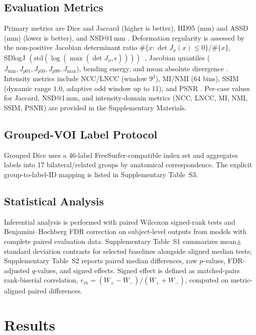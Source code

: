 \documentclass[jimaging,article,submit,pdftex,moreauthors]{Definitions/mdpi}
\begin{document}
\subsection{Evaluation Metrics}
Primary metrics are Dice and Jaccard (higher is better), HD95 (mm) and ASSD (mm) (lower is better), and NSD@1\,mm \cite{dice1945,heimann2009}. Deformation regularity is assessed by the non-positive Jacobian determinant ratio \(\#\{x:\det J_\phi(x)\le 0\}/\#\{x\}\), SDlogJ \(\left(\mathrm{std}(\log(\max(\det J_\phi,\epsilon)))\right)\)~\cite{hering2023learn2reg}, Jacobian quantiles (\(J_{\min}, J_{p01}, J_{p50}, J_{p99}, J_{\max}\)), bending energy, and mean absolute divergence \cite{bookstein1989tps,mok2020lapirn}. Intensity metrics include NCC/LNCC (window \(9^3\)), MI/NMI (64 bins), SSIM (dynamic range \(1.0\), adaptive odd window up to 11), and PSNR \cite{studholme1999nmi,wang2004ssim}. Per-case values for Jaccard, NSD@1\,mm, and intensity-domain metrics (NCC, LNCC, MI, NMI, SSIM, PSNR) are provided in the Supplementary Materials.

\subsection{Grouped-VOI Label Protocol}
Grouped Dice uses a 46-label FreeSurfer-compatible index set and aggregates labels into 17 bilateral/related groups by anatomical correspondence. The explicit group-to-label-ID mapping is listed in Supplementary Table~S3.

\subsection{Statistical Analysis}
Inferential analysis is performed with paired Wilcoxon signed-rank tests \cite{wilcoxon1945} and Benjamini--Hochberg FDR correction \cite{bh1995} on subject-level outputs from models with complete paired evaluation data. Supplementary Table~S1 summarizes mean\(\pm\)standard deviation contrasts for selected baselines alongside aligned median tests; Supplementary Table~S2 reports paired median differences, raw \(p\)-values, FDR-adjusted \(q\)-values, and signed effects. Signed effect is defined as matched-pairs rank-biserial correlation, \(r_{\mathrm{rb}}=(W_+-W_-)/(W_++W_-)\), computed on metric-aligned paired differences.

\section{Results}\label{sec:results}
\end{document}
